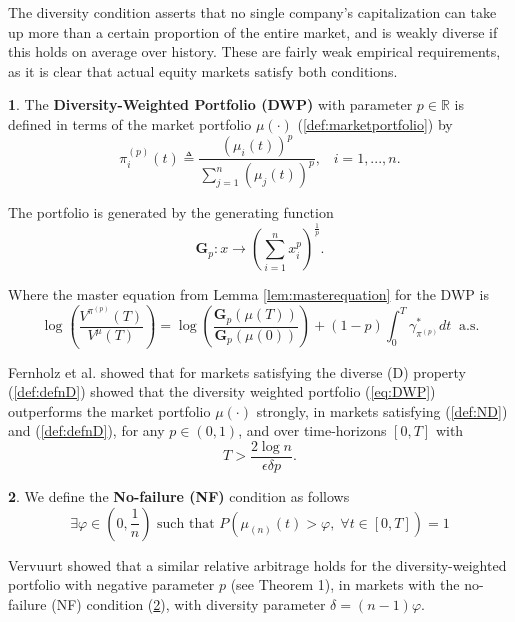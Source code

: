 \documentclass[british]{amsart} \usepackage{lmodern}
\numberwithin{equation}{section} \numberwithin{figure}{section}
\theoremstyle{plain} \newtheorem{thm}{\protect\theoremname}[section]
\theoremstyle{definition} \newtheorem{defn}[thm]{\protect\definitionname}
\theoremstyle{plain} \newtheorem{assumption}[thm]{\protect\assumptionname}
\theoremstyle{plain} \newtheorem{lem}[thm]{\protect\lemmaname}
\theoremstyle{plain} \newtheorem{prop}[thm]{\protect\propositionname}
\theoremstyle{remark} \newtheorem{rem}[thm]{\protect\remarkname}
\theoremstyle{plain} \newtheorem{cor}[thm]{\protect\corollaryname}
\begin{document}
The diversity condition asserts that no single company's
capitalization can take up more than a certain proportion of the entire
market, and is weakly diverse if this holds on average over history.
These are fairly weak empirical requirements, as it is clear that
actual equity markets satisfy both conditions.

\begin{defn}
The \textbf{Diversity-Weighted Portfolio (DWP) }with parameter $p\in\mathbb{R}$
is defined in terms of the market portfolio $\mu(\cdot)$ (\ref{def:marketportfolio})
by
\begin{equation}
\pi_{i}^{(p)}(t)\triangleq\frac{\left(\mu_{i}(t)\right)^{p}}{\sum_{j=1}^{n}\left(\mu_{j}(t)\right)^{p}},\;\;\;i=1,...,n.\label{eq:DWP}
\end{equation}

The portfolio is generated by the generating function
\begin{equation}
\mathbf{G}_{p}:x\to\left(\sum_{i=1}^{n}x_{i}^{p}\right)^{\frac{1}{p}}.
\end{equation}

Where the master equation from Lemma \ref{lem:masterequation} for the DWP
is
\begin{equation}
\log\left(\frac{V^{\pi^{(p)}}(T)}{V^{\mu}(T)}\right)=\log\left(\frac{\mathbf{G}_{p}(\mu(T))}{\mathbf{G}_{p}(\mu(0))}\right)+(1-p)\int_{0}^{T}\gamma_{\pi^{(p)}}^{*}dt\;\;\text{a.s.}
\end{equation}
\end{defn}
Fernholz et al. \cite{fernholz2005} showed that for markets satisfying
the diverse (D) property (\ref{def:defnD}) showed that the diversity
weighted portfolio (\ref{eq:DWP}) outperforms the market portfolio
$\mu(\cdot)$ strongly, in markets satisfying (\ref{def:ND}) and
(\ref{def:defnD}), for any $p\in(0,1)$, and over time-horizons $[0,T]$
with
\begin{equation}
T>\frac{2\log n}{\epsilon\delta p}.
\end{equation}

\begin{defn}
\label{def:NF}We define the \textbf{No-failure (NF) }condition as
follows
\begin{equation}
\exists\varphi\in(0,\frac{1}{n})\text{ such that }P\left(\mu_{(n)}(t)>\varphi,\;\forall t\in[0,T]\right)=1
\end{equation}

Vervuurt \cite{vervuurt2015} showed that a similar relative arbitrage
holds for the diversity-weighted portfolio with negative parameter
$p$ (see Theorem 1\cite{vervuurt2015}), in markets with the no-failure
(NF) condition (\ref{def:NF}), with diversity parameter $\delta=(n-1)\varphi$.
\end{defn}
%
\end{document}
